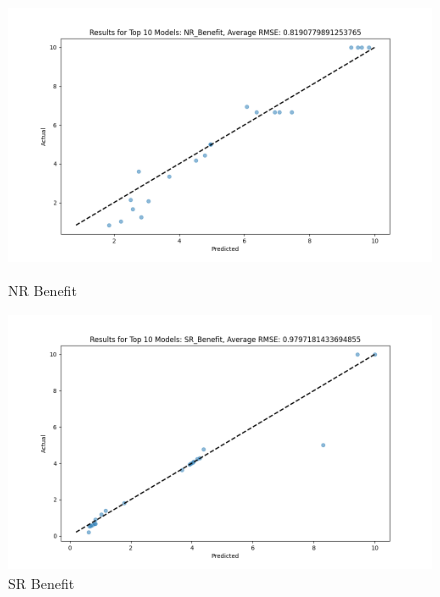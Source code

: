 \begin{figure}[H]
    \centering
    \begin{minipage}{0.495\textwidth}
        \centering
        \includegraphics[width=\linewidth]{reg_section_all/images_reg_ensemble/ensemble_learning_rmse_plot_top_10_Models_NR_Benefit.png}
        \caption{NR Benefit}
        \label{fig:nr_ben_ensemble}
    \end{minipage}\hfill
    \begin{minipage}{0.495\textwidth}
        \centering
        \includegraphics[width=\linewidth]{reg_section_all/images_reg_ensemble/ensemble_learning_rmse_plot_top_10_Models_SR_Benefit.png}
        \caption{SR Benefit}
        \label{fig:sr_ben_ensemble}
    \end{minipage}
\end{figure}

